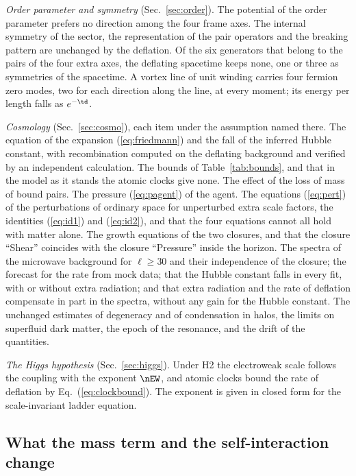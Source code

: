 \emph{Order parameter and symmetry} (Sec.~\ref{sec:order}). The potential of the order parameter
prefers no direction among the four frame axes. The internal symmetry of the sector, the
representation of the pair operators and the breaking pattern are unchanged by the deflation. Of the
six generators that belong to the pairs of the four extra axes, the deflating spacetime keeps none,
one or three as symmetries of the spacetime. A vortex line of unit winding carries four fermion zero
modes, two for each direction along the line, at every moment; its energy per length falls as
$e^{-\td}$.

\emph{Cosmology} (Sec.~\ref{sec:cosmo}), each item under the assumption named there. The equation of
the expansion (\ref{eq:friedmann}) and the fall of the inferred Hubble constant, with recombination
computed on the deflating background and verified by an independent calculation. The bounds of
Table~\ref{tab:bounds}, and that in the model as it stands the atomic clocks give none. The effect
of the loss of mass of bound pairs. The pressure (\ref{eq:pagent}) of the agent. The equations
(\ref{eq:pert}) of the perturbations of ordinary space for unperturbed extra scale factors, the
identities (\ref{eq:id1}) and (\ref{eq:id2}), and that the four equations cannot all hold with matter
alone. The growth equations of the two closures, and that the closure ``Shear'' coincides with the
closure ``Pressure'' inside the horizon. The spectra of the microwave background for $\ell\ge30$ and
their independence of the closure; the forecast for the rate from mock data; that the Hubble
constant falls in every fit, with or without extra radiation; and that extra radiation and the rate
of deflation compensate in part in the spectra, without any gain for the Hubble constant. The
unchanged estimates of degeneracy
and of condensation in halos, the limits on superfluid dark matter, the epoch of the resonance, and
the drift of the quantities.

\emph{The Higgs hypothesis} (Sec.~\ref{sec:higgs}). Under H2 the electroweak scale follows the
coupling with the exponent $\nEW$, and atomic clocks bound the rate of deflation by
Eq.~(\ref{eq:clockbound}). The exponent is given in closed form for the scale-invariant ladder
equation.

\subsection{What the mass term and the self-interaction change}
\label{sec:changes}


